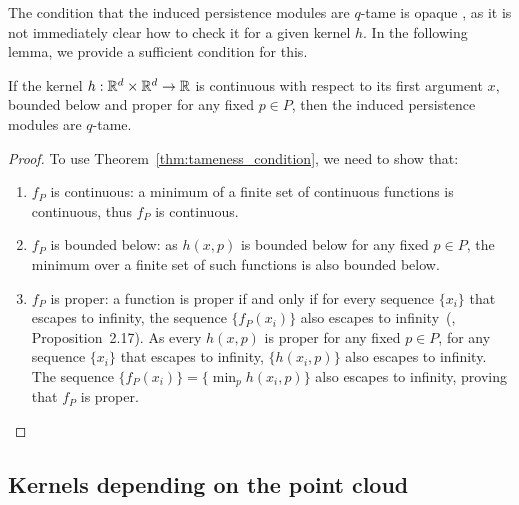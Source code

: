 The condition that the induced persistence modules are $q$-tame is opaque
, as it is not immediately clear how to check it for a
given kernel $h$. In the following lemma, we provide a sufficient condition
for this.
\begin{lemma}
    If the kernel $h : \mathbb{R}^d \times \mathbb{R}^d \to \mathbb{R}$ is continuous with respect to
    its first argument $x$, bounded below and proper for any fixed $p \in P$,
    then the induced persistence modules are $q$-tame.
\end{lemma}
\begin{proof}
    To use Theorem~\ref{thm:tameness_condition}, we need to show that:
    \begin{enumerate}
        \item $f_P$ is continuous: a minimum of a finite set of continuous
            functions is continuous, thus $f_P$ is continuous.
        \item $f_P$ is bounded below: as $h(x, p)$ is bounded below for any
            fixed $p \in P$, the minimum over a finite set of such functions
            is also bounded below.
        \item $f_P$ is proper: a function is proper if and only if for every
        sequence $\{x_i\}$ that escapes to infinity, the sequence
        $\{f_P(x_i)\}$ also escapes to infinity~(\cite{lee2003smooth}, Proposition~2.17).
        As every $h(x, p)$ is proper for any fixed $p \in P$, for any
        sequence $\{x_i\}$ that escapes to infinity, $\{h(x_i, p)\}$ also
        escapes to infinity. The sequence $\{f_P(x_i)\} = \{\min_p h(x_i, p)\}$
        also escapes to infinity, proving that $f_P$ is proper.
    \end{enumerate}
\end{proof}

\subsection{Kernels depending on the point cloud}

